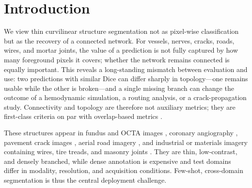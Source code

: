 \section{Introduction}
\label{sec:intro}

We view thin curvilinear structure segmentation not as pixel-wise
classification but as the recovery of a connected network. For vessels, nerves, cracks, roads, wires,
and mortar joints, the value of a prediction is not fully captured by how many
foreground pixels it covers; whether the network remains connected is equally
important. This reveals a long-standing mismatch between evaluation and use:
two predictions with similar
Dice can differ sharply in topology---one remains usable while the other is
broken---and a single missing branch can change the outcome of a hemodynamic
simulation, a routing analysis, or a crack-propagation study. Connectivity and
topology are therefore not auxiliary metrics; they are first-class criteria on
par with overlap-based metrics \cite{shit2021cldice,kirchhoff2024skeletonrecall}.

These structures appear in fundus and OCTA images
\cite{staal2004drive,hoover2000stare,budai2013robust,li2024octa500}, coronary
angiography \cite{cervantes2019dca1}, pavement crack images
\cite{liu2019deepcrack}, aerial road imagery \cite{mnih2013machine}, and
industrial or materials imagery containing wires, tire treads, and masonry
joints \cite{zhu2026sacm,valverde2025topomortar}. They are thin, low-contrast,
and densely branched, while dense annotation is expensive and test domains
differ in modality, resolution, and acquisition conditions. Few-shot, cross-domain segmentation
is thus the central deployment challenge.

